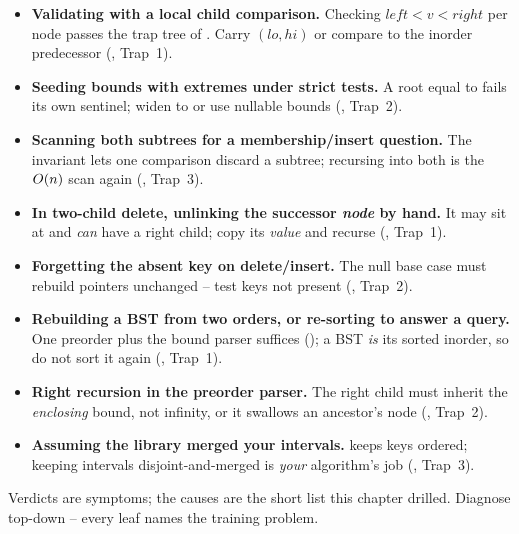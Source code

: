 \begin{itemize}[nosep, leftmargin=1.4em]
  \item \textbf{Validating with a local child comparison.} Checking $\mathit{left}<v<\mathit{right}$
        per node passes the trap tree of . Carry $(\mathit{lo},\mathit{hi})$ or
        compare to the inorder predecessor (, Trap~1).
  \item \textbf{Seeding bounds with  extremes under strict tests.} A root equal to
         fails its own sentinel; widen to  or use nullable bounds
        (, Trap~2).
  \item \textbf{Scanning both subtrees for a membership/insert question.} The invariant lets one
        comparison discard a subtree; recursing into both is the $O(n)$ scan again
        (, Trap~3).
  \item \textbf{In two-child delete, unlinking the successor \emph{node} by hand.} It may sit at
         and \emph{can} have a right child; copy its \emph{value} and recurse
        (, Trap~1).
  \item \textbf{Forgetting the absent key on delete/insert.} The null base case must rebuild pointers
        unchanged -- test keys not present (, Trap~2).
  \item \textbf{Rebuilding a BST from two orders, or re-sorting to answer a query.} One preorder plus
        the bound parser suffices (); a BST \emph{is} its sorted inorder, so do
        not sort it again (, Trap~1).
  \item \textbf{Right recursion  in the preorder parser.} The right child must
        inherit the \emph{enclosing} bound, not infinity, or it swallows an ancestor's node
        (, Trap~2).
  \item \textbf{Assuming the library merged your intervals.}  keeps keys ordered; keeping
        intervals disjoint-and-merged is \emph{your} algorithm's job (, Trap~3).
\end{itemize}


Verdicts are symptoms; the causes are the short list this chapter drilled. Diagnose top-down -- every
leaf names the training problem.

